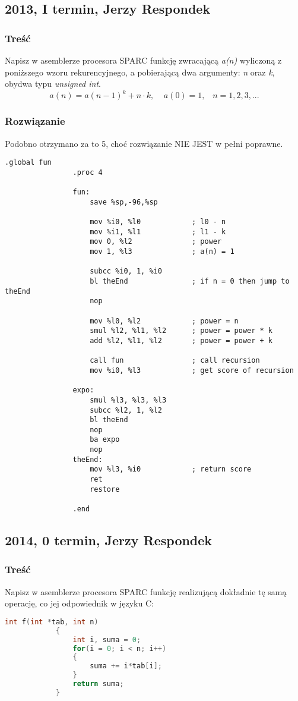 	\newpage
	\subsection{2013, I termin, Jerzy Respondek}
		\subsubsection{Treść}
			Napisz w asemblerze procesora SPARC funkcję zwracającą \emph{a(n)} wyliczoną z poniższego wzoru rekurencyjnego, a pobierającą dwa argumenty: \emph{n} oraz \emph{k}, obydwa typu \textit{unsigned int}.
			$$ a(n)=a(n-1)^k+n\cdot k,\;\;\;\;a(0)=1,\;\;\;n=1,2,3,... $$
		\subsubsection{Rozwiązanie}
			Podobno otrzymano za to 5, choć rozwiązanie NIE JEST w pełni poprawne.
			\begin{lstlisting}[language={[sparc]Assembler}]
				.global fun
				.proc 4
				
				fun:
					save %sp,-96,%sp
					
					mov %i0, %l0			; l0 - n
					mov %i1, %l1			; l1 - k
					mov 0, %l2				; power
					mov 1, %l3				; a(n) = 1
					
					subcc %i0, 1, %i0
					bl theEnd				; if n = 0 then jump to theEnd
					nop
					
					mov %l0, %l2			; power = n
					smul %l2, %l1, %l2		; power = power * k
					add %l2, %l1, %l2		; power = power + k
					
					call fun				; call recursion
					mov %i0, %l3			; get score of recursion
				
				expo:
					smul %l3, %l3, %l3
					subcc %l2, 1, %l2
					bl theEnd
					nop
					ba expo
					nop
				theEnd:
					mov %l3, %i0			; return score
					ret
					restore
				
				.end
			\end{lstlisting}
		
	\newpage
	\subsection{2014, 0 termin, Jerzy Respondek}
		\subsubsection{Treść}
			Napisz w asemblerze procesora SPARC funkcję realizującą dokładnie tę samą operację, co jej odpowiednik w języku C:
			\begin{lstlisting}[language=C]
			int f(int *tab, int n) 
			{
				int i, suma = 0;
				for(i = 0; i < n; i++)
				{
					suma += i*tab[i];
				}
				return suma;
			}
			\end{lstlisting}
